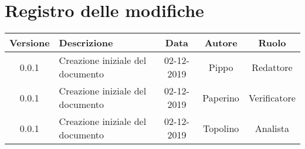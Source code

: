 \section*{Registro delle modifiche}

\begin{center}
	\begin{longtable}{|c|p{5cm}|c|c|c|}
	\hline
	\rowcolor{lighter-grayer}
	\textbf{Versione} & \textbf{Descrizione} & \textbf{Data} & \textbf{Autore} & \textbf{Ruolo} \\
	\hline
	\endfirsthead


	\hline
	0.0.1 & Creazione iniziale del documento & 02-12-2019 & Pippo & Redattore \\
	0.0.1 & Creazione iniziale del documento & 02-12-2019 & Paperino & Verificatore\\
    0.0.1 & Creazione iniziale del documento & 02-12-2019 & Topolino & Analista\\
	\hline

	\end{longtable}
\end{center}